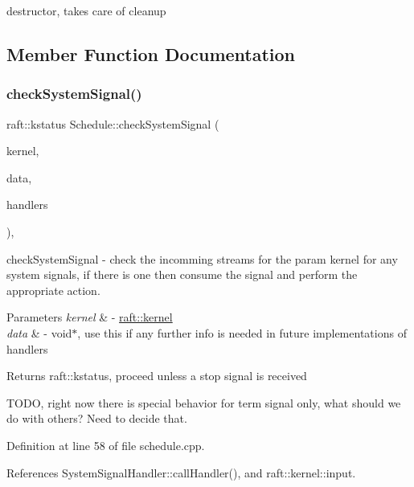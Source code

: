destructor, takes care of cleanup 

\subsection{Member Function Documentation}
\hypertarget{class_schedule_a85de3d48407aa378ccc86a4a4206b32a}{}\label{class_schedule_a85de3d48407aa378ccc86a4a4206b32a} 
\subsubsection{\texorpdfstring{check\+System\+Signal()}{checkSystemSignal()}}
{\footnotesize\ttfamily raft\+::kstatus Schedule\+::check\+System\+Signal (\begin{DoxyParamCaption}\item[{\hyperlink{classraft_1_1kernel}{raft\+::kernel} $\ast$const}]{kernel,  }\item[{void $\ast$}]{data,  }\item[{\hyperlink{class_system_signal_handler}{System\+Signal\+Handler} \&}]{handlers }\end{DoxyParamCaption})\hspace{0.3cm}{\ttfamily [static]}, {\ttfamily [protected]}}

check\+System\+Signal -\/ check the incomming streams for the param kernel for any system signals, if there is one then consume the signal and perform the appropriate action. 
\begin{DoxyParams}{Parameters}
{\em kernel} & -\/ \hyperlink{classraft_1_1kernel}{raft\+::kernel} \\
\hline
{\em data} & -\/ void$\ast$, use this if any further info is needed in future implementations of handlers \\
\hline
\end{DoxyParams}
\begin{DoxyReturn}{Returns}
raft\+::kstatus, proceed unless a stop signal is received 
\end{DoxyReturn}
T\+O\+DO, right now there is special behavior for term signal only, what should we do with others? Need to decide that.

Definition at line 58 of file schedule.\+cpp.



References System\+Signal\+Handler\+::call\+Handler(), and raft\+::kernel\+::input.


